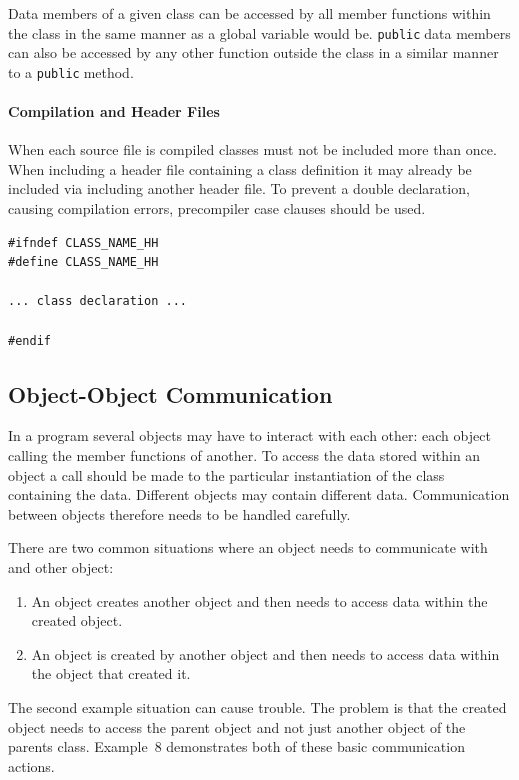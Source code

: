 \documentclass[11pt,a4paper]{scrartcl}
\def\public{\texttt{public}$\;$}
\begin{document}
Data members of a given class can be accessed by all member functions
within the class in the same manner as a global variable would be.
\public data members can also be accessed by any other function
outside the class in a similar manner to a \public method.

\paragraph{Compilation and Header Files}
When each source file is compiled classes must not be included more
than once.  When including a header file containing a class definition
it may already be included via including another header file.  To
prevent a double declaration, causing compilation errors,
precompiler case clauses should be used.

\begin{verbatim}
#ifndef CLASS_NAME_HH
#define CLASS_NAME_HH

... class declaration ...

#endif
\end{verbatim}


\subsection{Object-Object Communication}

In a program several objects may have to interact with each other:
each object calling the member functions of another.  To access the
data stored within an object a call should be made to the particular
instantiation of the class containing the data.  Different objects may
contain different data.  Communication between objects therefore needs
to be handled carefully.

There are two common situations where an object needs to communicate
with and other object: 
\begin{enumerate}
\item An object creates another object and then needs to access data
within the created object.
\item An object is created by another object and then needs to access
data within the object that created it.
\end{enumerate}
The second example situation can cause trouble.  The problem is that
the created object needs to access the parent object and not just
another object of the parents class.  Example~8 demonstrates both of
these basic communication actions.
\end{document}
